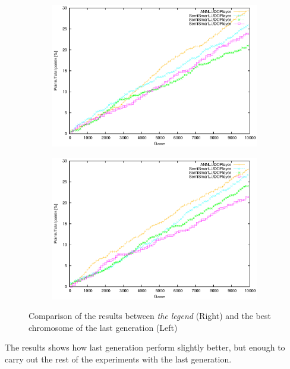 			\begin{figure}[!ht]
				\centering
				\begin{subfigure}{.5\textwidth}
				  \centering
				  \includegraphics[width=\textwidth]{figures/the_legend_last_generation}

				\end{subfigure}%
				\begin{subfigure}{.5\textwidth}
				  \centering
				  \includegraphics[width=\textwidth]{figures/the_legend_the_legend}
				\end{subfigure}
				\caption{Comparison of the results between \emph{the legend} (Right) and the best chromosome of the last generation (Left)}
				\label{fig:the_legend_comparison}
			\end{figure}
		The results shows how last generation perform slightly better, but enough to carry out the rest of the experiments with the last generation.


